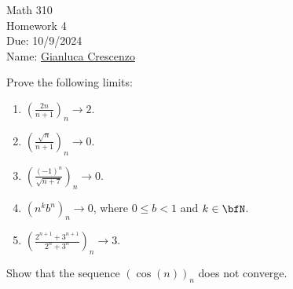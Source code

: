 \documentclass[10pt,twoside,openany]{memoir}
\begin{document}
\begin{center}
    { \Large Math 310 \\[0.1in]Homework 4 \\[0.1in]
    Due: 10/9/2024}\\[.25in]
    { Name:} {\underline{Gianluca Crescenzo\hspace*{2in}}}\\[0.15in]
    \end{center}
    \vspace{4pt}
    \begin{exercise}
        Prove the following limits:
            \begin{enumerate}[label = (\arabic*)]
                \item $\left(\frac{2n}{n+1}\right)_n \rightarrow 2$.
                \item $\left(\frac{\sqrt{n}}{n+1}\right)_n \rightarrow 0$.
                \item $\left(\frac{(-1)^n}{\sqrt{n+7}}\right)_n \rightarrow 0$.
                \item $(n^k b^n)_n \rightarrow 0$, where $0 \leq b < 1$ and $k \in \bfN$.
                \item $\left(\frac{2^{n+1}+3^{n+1}}{2^n + 3^n}\right)_n \rightarrow 3$.
            \end{enumerate}
    \end{exercise}
    \begin{exercise}
        Show that the sequence $(\cos(n))_n$ does not converge.
    \end{exercise}
\end{document}
